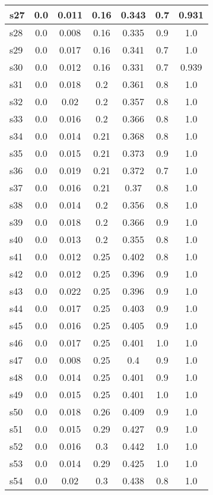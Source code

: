 \documentclass{article}
\begin{document}
\begin{tabular}{|l|c|c|c|c|c|c|}
\hline
s27 &0.0 & 0.011 & 0.16 & 0.343 & 0.7 & 0.931\\
\hline
s28 &0.0 & 0.008 & 0.16 & 0.335 & 0.9 & 1.0\\
\hline
s29 &0.0 & 0.017 & 0.16 & 0.341 & 0.7 & 1.0\\
\hline
s30 &0.0 & 0.012 & 0.16 & 0.331 & 0.7 & 0.939\\
\hline
s31 &0.0 & 0.018 & 0.2 & 0.361 & 0.8 & 1.0\\
\hline
s32 &0.0 & 0.02 & 0.2 & 0.357 & 0.8 & 1.0\\
\hline
s33 &0.0 & 0.016 & 0.2 & 0.366 & 0.8 & 1.0\\
\hline
s34 &0.0 & 0.014 & 0.21 & 0.368 & 0.8 & 1.0\\
\hline
s35 &0.0 & 0.015 & 0.21 & 0.373 & 0.9 & 1.0\\
\hline
s36 &0.0 & 0.019 & 0.21 & 0.372 & 0.7 & 1.0\\
\hline
s37 &0.0 & 0.016 & 0.21 & 0.37 & 0.8 & 1.0\\
\hline
s38 &0.0 & 0.014 & 0.2 & 0.356 & 0.8 & 1.0\\
\hline
s39 &0.0 & 0.018 & 0.2 & 0.366 & 0.9 & 1.0\\
\hline
s40 &0.0 & 0.013 & 0.2 & 0.355 & 0.8 & 1.0\\
\hline
s41 &0.0 & 0.012 & 0.25 & 0.402 & 0.8 & 1.0\\
\hline
s42 &0.0 & 0.012 & 0.25 & 0.396 & 0.9 & 1.0\\
\hline
s43 &0.0 & 0.022 & 0.25 & 0.396 & 0.9 & 1.0\\
\hline
s44 &0.0 & 0.017 & 0.25 & 0.403 & 0.9 & 1.0\\
\hline
s45 &0.0 & 0.016 & 0.25 & 0.405 & 0.9 & 1.0\\
\hline
s46 &0.0 & 0.017 & 0.25 & 0.401 & 1.0 & 1.0\\
\hline
s47 &0.0 & 0.008 & 0.25 & 0.4 & 0.9 & 1.0\\
\hline
s48 &0.0 & 0.014 & 0.25 & 0.401 & 0.9 & 1.0\\
\hline
s49 &0.0 & 0.015 & 0.25 & 0.401 & 1.0 & 1.0\\
\hline
s50 &0.0 & 0.018 & 0.26 & 0.409 & 0.9 & 1.0\\
\hline
s51 &0.0 & 0.015 & 0.29 & 0.427 & 0.9 & 1.0\\
\hline
s52 &0.0 & 0.016 & 0.3 & 0.442 & 1.0 & 1.0\\
\hline
s53 &0.0 & 0.014 & 0.29 & 0.425 & 1.0 & 1.0\\
\hline
s54 &0.0 & 0.02 & 0.3 & 0.438 & 0.8 & 1.0\\
\hline

\end{tabular}
\end{document}
